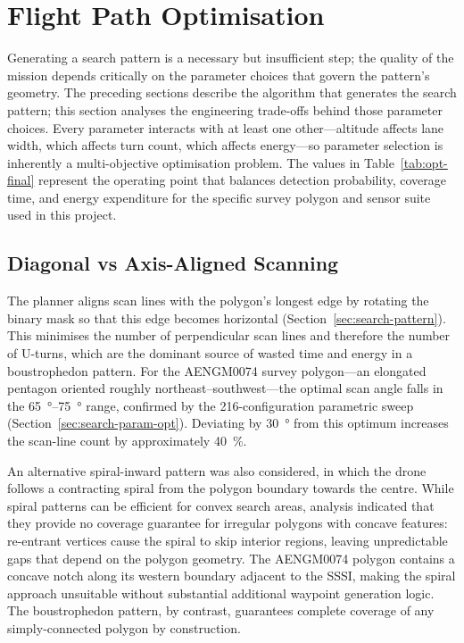
\section{Flight Path Optimisation}\label{sec:path-tradeoffs}

Generating a search pattern is a necessary but insufficient step; the quality of the mission depends critically on the parameter choices that govern the pattern's geometry.  The preceding sections describe the algorithm that generates the search pattern; this section analyses the engineering trade-offs behind those parameter choices.  Every parameter interacts with at least one other---altitude affects lane width, which affects turn count, which affects energy---so parameter selection is inherently a multi-objective optimisation problem.  The values in Table~\ref{tab:opt-final} represent the operating point that balances detection probability, coverage time, and energy expenditure for the specific survey polygon and sensor suite used in this project.

\subsection{Diagonal vs Axis-Aligned Scanning}\label{sec:diagonal}

The planner aligns scan lines with the polygon's longest edge by rotating the binary mask so that this edge becomes horizontal (Section~\ref{sec:search-pattern}).  This minimises the number of perpendicular scan lines and therefore the number of U-turns, which are the dominant source of wasted time and energy in a boustrophedon pattern.  For the AENGM0074 survey polygon---an elongated pentagon oriented roughly northeast--southwest---the optimal scan angle falls in the \SIrange{65}{75}{\degree} range, confirmed by the 216-configuration parametric sweep (Section~\ref{sec:search-param-opt}).  Deviating by \SI{30}{\degree} from this optimum increases the scan-line count by approximately \SI{40}{\percent}.

An alternative spiral-inward pattern was also considered, in which the drone follows a contracting spiral from the polygon boundary towards the centre.  While spiral patterns can be efficient for convex search areas, analysis indicated that they provide no coverage guarantee for irregular polygons with concave features: re-entrant vertices cause the spiral to skip interior regions, leaving unpredictable gaps that depend on the polygon geometry.  The AENGM0074 polygon contains a concave notch along its western boundary adjacent to the SSSI, making the spiral approach unsuitable without substantial additional waypoint generation logic.  The boustrophedon pattern, by contrast, guarantees complete coverage of any simply-connected polygon by construction.

